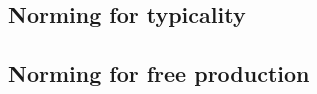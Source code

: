 \documentclass[a4paper,man,floatsintext,natbib,donotrepeattitle]{apa6}
\begin{document}
\subsection{Norming for typicality}
\label{typicalitynorming}







\subsection{Norming for free production}
\label{freeprodnorming}






\end{document}
